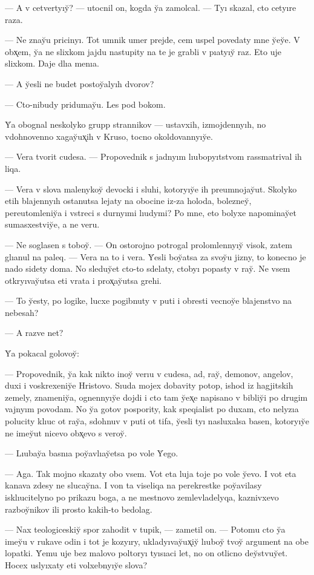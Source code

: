\documentclass[10pt]{book}
\begin{document}
— A v cetvertyıy̆? — utocnil on, kogda y̆a zamolcal. — Tyı skazal, cto cetyıre raza.

— Ne znay̆u pricinyı. Tot umnik umer prejde, cem uspel povedaty mne y̆ey̆e. V obx̨em, y̆a ne slixkom jajdu nastupity na te je grabli v pıatyıy̆ raz. Eto uje slixkom. Daje dlıa menıa.

— A y̆esli ne budet postoy̆alyıh dvorov?

— Cto-nibudy pridumay̆u. Les pod bokom.

Y̆a obognal neskolyko grupp strannikov — ustavxih, izmojdennyıh, no vdohnovenno xagay̆ux̨ih v Kruso, tocno okoldovannyıy̆e.

— Vera tvorit cudesa. — Propovednik s jadnyım lıubopyıtstvom rassmatrival ih liqa.

— Vera v slova malenykoy̆ devocki i sluhi, kotoryıy̆e ih preumnojay̆ut. Skolyko etih blajennyıh ostanutsa lejaty na obocine iz-za holoda, bolezney̆, pereutomleniy̆a i vstreci s durnyımi lıudymi? Po mne, eto bolyxe napominay̆et sumasxestviy̆e, a ne veru.

— Ne soglasen s toboy̆. — On ostorojno potrogal prolomlennyıy̆ visok, zatem glıanul na paleq. — Vera na to i vera. Y̆esli boy̆atsa za svoy̆u jizny, to konecno je nado sidety doma. No sleduy̆et cto-to sdelaty, ctobyı popasty v ray̆. Ne vsem otkryıvay̆utsa eti vrata i prox̨ay̆utsa grehi.

— To y̆esty, po logike, lucxe pogibnuty v puti i obresti vecnoy̆e blajenstvo na nebesah?

— A razve net?

Y̆a pokacal golovoy̆:

— Propovednik, y̆a kak nikto inoy̆ verıu v cudesa, ad, ray̆, demonov, angelov, duxi i voskrexeniy̆e Hristovo. Sıuda mojex dobavity potop, ishod iz hagjitskih zemely, znameniy̆a, ognennyıy̆e dojdi i cto tam y̆ex̨e napisano v bibliy̆i po drugim vajnyım povodam. No y̆a gotov pospority, kak speqialist po duxam, cto nelyzıa polucity klıuc ot ray̆a, sdohnuv v puti ot tifa, y̆esli tyı nasluxalsa basen, kotoryıy̆e ne imey̆ut nicevo obx̨evo s veroy̆.

— Lıubay̆a basnıa poy̆avlıay̆etsa po vole Y̆ego.

— Aga. Tak mojno skazaty obo vsem. Vot eta luja toje po vole y̆evo. I vot eta kanava zdesy ne slucay̆na. I von ta viseliqa na perekrestke poy̆avilasy isklıucitelyno po prikazu boga, a ne mestnovo zemlevladelyqa, kaznivxevo razboy̆nikov ili prosto kakih-to bedolag.

— Nax teologiceskiy̆ spor zahodit v tupik, — zametil on. — Potomu cto y̆a imey̆u v rukave odin i tot je kozyıry, ukladyıvay̆ux̨iy̆ lıuboy̆ tvoy̆ argument na obe lopatki. Y̆emu uje bez malovo poltoryı tyısıaci let, no on otlicno dey̆stvuy̆et. Hocex uslyıxaty eti volxebnyıy̆e slova?
\end{document}

